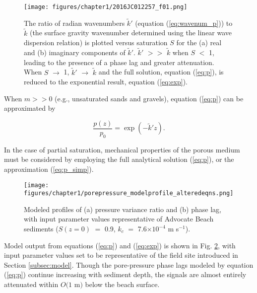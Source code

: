 \begin{figure} %
\begin{center}
		\noindent\texttt{[image: figures/chapter1/2016JC012257\_f01.png]}
	\caption[Theoretical wavenumber ratios as functions of saturation]{The ratio of radian wavenumbers $\tilde{k}'$ (equation (\ref{eq:wavenum_p})) to $\tilde{k}$ (the surface gravity wavenumber determined using the linear wave dispersion relation) is plotted versus saturation $S$ for the (a) real and (b) imaginary components of $\tilde{k}'$. $\tilde{k}'$ $>>$ $\tilde{k}$ when $S$ $<$ 1, leading to the presence of a phase lag and greater attenuation. When $S$ $\rightarrow$ 1, $\tilde{k}'$ $\rightarrow$ $\tilde{k}$ and the full solution, equation (\ref{eq:p}), is reduced to the exponential result, equation (\ref{eq:exp}).}
	\label{fig:wavenumber}
\end{center}
\end{figure}

When $m>>0$ (e.g., unsaturated sands and gravels), equation (\ref{eq:p}) can be approximated by 

\begin{equation}\label{eq:p_simp}
\frac{p(z)}{p_{0}} = \exp(-\tilde{k}' z).
\end{equation}

\noindent In the case of partial saturation, mechanical properties of the porous medium must be considered by employing the full analytical solution (\ref{eq:p}), or the approximation (\ref{eq:p_simp}). 

\begin{figure} %
\begin{center}	
		\noindent\texttt{[image: figures/chapter1/porepressure\_modelprofile\_alteredeqns.png]}
	\caption[Modeled pressure variance ratio and phase with sediment depth]{Modeled profiles of (a) pressure variance ratio and (b) phase lag, with input parameter values representative of Advocate Beach sediments ($S(z=0)$ $=$ 0.9, $k_{c}$ $=$ 7.6$\times10^{-4}$ m s$^{-1}$).}
	\label{fig:model_5m}
\end{center}
\end{figure}


Model output from equations (\ref{eq:p}) and (\ref{eq:exp}) is shown in Fig. \ref{fig:model_5m}, with input parameter values set to be representative of the field site introduced in Section \ref{subsec:model}. Though the pore-pressure phase lags modeled by equation (\ref{eq:p}) continue increasing with sediment depth, the signals are almost entirely attenuated within $O(1$ m$)$ below the beach surface.


